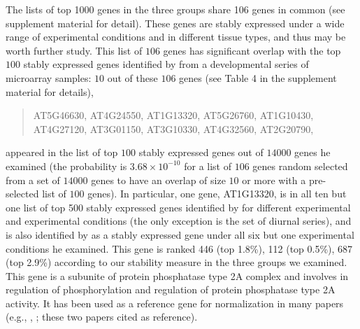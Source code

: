 \documentclass[letterpaper,12pt]{article}
\begin{document}

The lists of top 1000 genes in the three groups share 106 genes in common (see supplement material for detail).  These
genes are stably expressed under a wide range of experimental conditions and
in different tissue types, and thus may be worth further study. This list of
$106$ genes has significant overlap with the top $100$ stably expressed genes
identified by \cite{czechowski2005genome} from a developmental series of
microarray samples: $10$ out of these $106$ genes (see Table 4 in the
supplement material for details),
\begin{center}
\begin{quote}
	AT5G46630, AT4G24550, AT1G13320, AT5G26760, AT1G10430, \\
	AT4G27120, AT3G01150, AT3G10330, AT4G32560, AT2G20790,
\end{quote}
\end{center}
appeared in the list of top $100$ stably expressed genes
out of $14000$ genes he examined (the probability is $3.68\times10^{-10}$ for
a list of $106$ genes random selected from a set of $14000$ genes to have an
overlap of size $10$ or more with a pre-selected list of $100$ genes). In
particular, one gene, AT1G13320, is in all ten but one list of top 500 stably
expressed genes identified by \cite{czechowski2005genome} for different
experimental and experimental conditions (the only exception is the set of
diurnal series), and is also identified by
\cite{hong2010identification} as a stably expressed gene under all six but one
experimental conditions he examined.  This gene is ranked 446 (top 1.8\%), 112
(top 0.5\%), 687 (top 2.9\%) according to our stability measure in the three
groups we examined.
This gene is a subunite of protein phosphatase type 2A complex and involves in
regulation of phosphorylation and regulation of protein phosphatase type 2A
activity. It has been used as a reference gene for normalization in many
papers (e.g., \cite{bournier2013arabidopsis}, \cite{baron2012transcriptional};
these two papers cited \cite{czechowski2005genome} as reference). 

\end{document}
